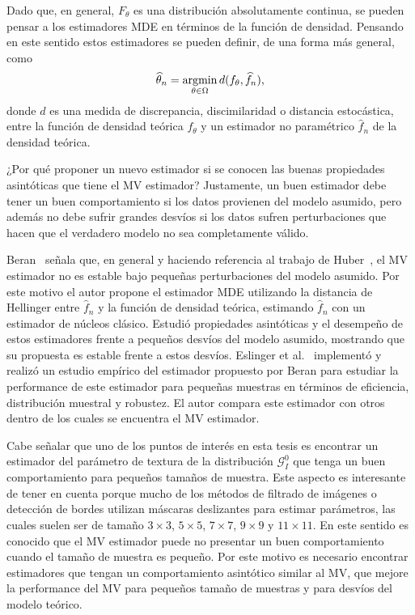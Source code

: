 Dado que, en general, $F_{\theta}$ es una distribución absolutamente continua, se pueden pensar a los estimadores MDE en términos de la función de densidad. Pensando en este sentido estos estimadores se pueden definir, de una forma más general, como 
\begin{align}
\widehat{\theta}_n=\mathop{\rm argmin} \limits_{\theta\in\Omega} d(f_{\theta}, \widehat{f}_n),
\end{align}
donde $d$ es una medida de discrepancia, discimilaridad o distancia estocástica, entre la función de densidad teórica $f_{\theta}$ y un estimador no paramétrico $\widehat{f}_n$ de la densidad teórica.

¿Por qué proponer un nuevo estimador si se conocen las buenas propiedades asintóticas que tiene el MV estimador? Justamente, un buen estimador debe tener un buen comportamiento si los datos provienen del modelo asumido, pero además no debe sufrir grandes desvíos si los datos sufren perturbaciones que hacen que el verdadero modelo no sea completamente válido. 

Beran~\cite{beran1977} señala que, en general y haciendo referencia al trabajo de Huber~\cite{Huber1972}, el MV estimador no es estable bajo pequeñas perturbaciones del modelo asumido. Por este motivo el autor propone el estimador MDE utilizando la distancia de Hellinger entre $\widehat{f}_n$ y la función de densidad teórica, estimando $\widehat{f}_n$ con un estimador de núcleos clásico. Estudió propiedades asintóticas y el desempeño de estos estimadores frente a pequeños desvíos del modelo asumido, mostrando que su propuesta es estable frente a estos desvíos. Eslinger et al.~\cite{Eslinger1990} implementó y realizó un estudio empírico del estimador propuesto por Beran para estudiar la performance de este estimador para pequeñas muestras en términos de eficiencia, distribución muestral y robustez. El autor compara este estimador con otros dentro de los cuales se encuentra el MV estimador.

Cabe señalar que uno de los puntos de interés en esta tesis es encontrar un estimador del parámetro de  textura de la distribución $\mathcal{G}_I^{0}$ que tenga un buen comportamiento para pequeños tamaños de muestra. Este aspecto es interesante de tener en cuenta porque mucho de los métodos de filtrado de imágenes o detección de bordes utilizan máscaras deslizantes para estimar parámetros, las cuales suelen ser de tamaño $3 \times 3$, $5 \times 5$, $7 \times 7$, $9 \times 9$ y $11 \times 11$. En este sentido es conocido que el MV estimador puede no presentar un buen comportamiento cuando el tamaño de muestra es pequeño. Por este motivo es necesario encontrar estimadores que tengan un comportamiento asintótico similar al MV, que mejore la performance del MV para pequeños tamaño de muestras y para desvíos del modelo teórico.

